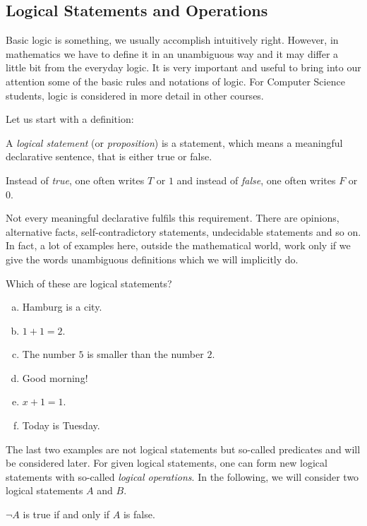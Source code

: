 
\subsection*{Logical Statements and Operations}

Basic logic is something, we usually accomplish intuitively right. However, in mathematics we have to define it in an unambiguous way
and it may differ a little bit from the everyday logic.
It is very important and useful to bring into our attention some of the basic rules and notations of logic. 
For Computer Science students, logic is considered in more detail in other courses. 

Let us start with a definition:
\begin{definition}
A \emph{logical statement} (or \emph{proposition})
is a statement, which means a meaningful declarative sentence,
that is either true or false.
\end{definition}

Instead of \emph{true}, one often writes $T$ or $1$
and instead of \emph{false}, one often writes $F$ or $0$.

Not every meaningful declarative fulfils this requirement. 
There are opinions, alternative facts, self-contradictory statements, undecidable statements and so on. In fact, a lot of examples here, outside the mathematical world, work only if we give the words unambiguous definitions
which we will implicitly do.

\begin{example}
Which of these are logical statements?
 	\begin{enumerate}[(a)]
 		\item Hamburg is a city.
 		\item $1 + 1 = 2$.
 		\item The number $5$ is smaller than the number $2$.
 		\item Good morning!
 		\item $x + 1 = 1$.
 		\item Today is Tuesday.
 	\end{enumerate}
\end{example}
%
The last two examples are not logical statements but so-called predicates and will be considered later.
%
For given logical statements, one can form new logical statements with so-called \emph{logical operations}.
In the following, we will consider two logical statements $A$ and $B$.

\begin{definition}
 $\neg A$ is true if and only if $A$ is false.
\end{definition}

